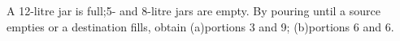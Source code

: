 A 12-litre jar is full;5- and 8-litre jars are empty. By pouring until a source empties or a destination fills, obtain (a)portions 3 and 9; (b)portions 6 and 6.
